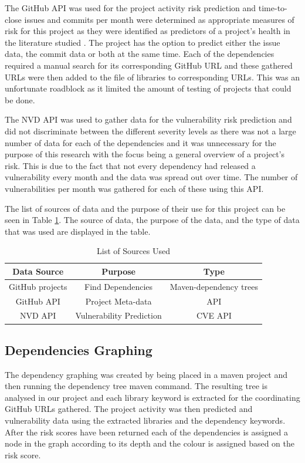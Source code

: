 \documentclass[conference]{IEEEtran}
\begin{document}
{The GitHub API was used for the project activity risk prediction and time-to-close issues and commits per month were determined as appropriate measures of risk for this project as they were identified as predictors of a project's health in the literature studied \cite{xia_predicting_2022}. The project has the option to predict either the issue data, the commit data or both at the same time. Each of the dependencies required a manual search for its corresponding GitHub URL and these gathered URLs were then added to the file of libraries to corresponding URLs. This was an unfortunate roadblock as it limited the amount of testing of projects that could be done. 

The NVD API was used to gather data for the vulnerability risk prediction and did not discriminate between the different severity levels as there was not a large number of data for each of the dependencies and it was unnecessary for the purpose of this research with the focus being a general overview of a project's risk. This is due to the fact that not every dependency had released a vulnerability every month and the data was spread out over time.  The number of vulnerabilities per month was gathered for each of these using this API. 

The list of sources of data and the purpose of their use for this project can be seen in Table \ref{sourcelist}. The source of data, the purpose of the data, and the type of data that was used are displayed in the table. 

\begin{table}
 \caption{List of Sources Used}
\label{sourcelist}
\begin{center}
\begin{tabular}{|c|c|c|}
\hline
    \textbf{Data Source} & \textbf{Purpose} & \textbf{Type} \\ \hline
    GitHub projects & Find Dependencies & Maven-dependency trees \\ \hline
    GitHub API & Project Meta-data & API  \\ \hline
    NVD API & Vulnerability Prediction & CVE API \\ \hline
\end{tabular}
\end{center}
\end{table}

\subsection{Dependencies Graphing}
The dependency graphing was created by being placed in a maven project and then running the dependency tree maven command. The resulting tree is analysed in our project and each library keyword is extracted for the coordinating GitHub URLs gathered. The project activity was then predicted and vulnerability data using the extracted libraries and the dependency keywords. After the risk scores have been returned each of the dependencies is assigned a node in the graph according to its depth and the colour is assigned based on the risk score.

}
\end{document}
